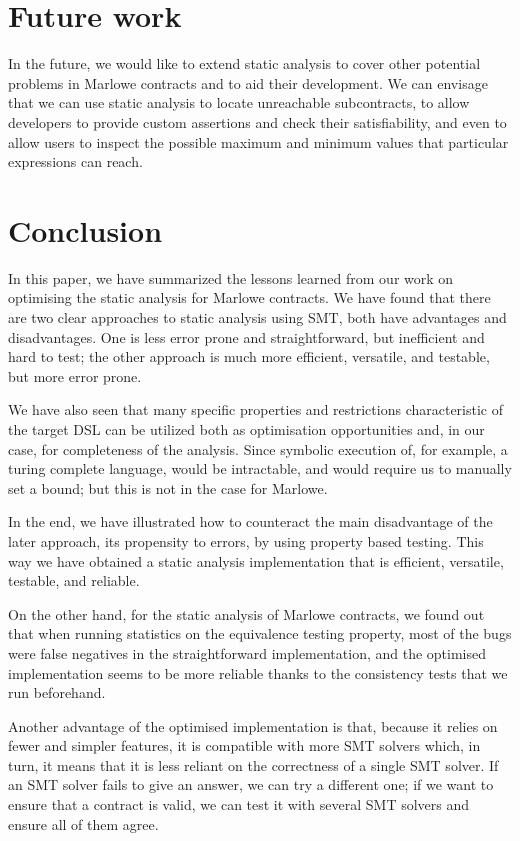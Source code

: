 \documentclass[english,runningheads]{llncs}
\begin{document}
\section{Future work }

In the future, we would like to extend static analysis to cover other
potential problems in Marlowe contracts and to aid their development.
We can envisage that we can use static analysis to locate unreachable
subcontracts, to allow developers to provide custom assertions and
check their satisfiability, and even to allow users to inspect the
possible maximum and minimum values that particular expressions can
reach. 

\section{Conclusion}

In this paper, we have summarized the lessons learned from our work
on optimising the static analysis for Marlowe contracts. We have found
that there are two clear approaches to static analysis using SMT,
both have advantages and disadvantages. One is less error prone and
straightforward, but inefficient and hard to test; the other approach
is much more efficient, versatile, and testable, but more error prone.

We have also seen that many specific properties and restrictions characteristic
of the target DSL can be utilized both as optimisation opportunities
and, in our case, for completeness of the analysis. Since symbolic
execution of, for example, a turing complete language, would be intractable,
and would require us to manually set a bound; but this is not in the
case for Marlowe.

In the end, we have illustrated how to counteract the main disadvantage
of the later approach, its propensity to errors, by using property
based testing. This way we have obtained a static analysis implementation
that is efficient, versatile, testable, and reliable.

On the other hand, for the static analysis of Marlowe contracts, we
found out that when running statistics on the equivalence testing
property, most of the bugs were false negatives in the straightforward
implementation, and the optimised implementation seems to be more
reliable thanks to the consistency tests that we run beforehand.

Another advantage of the optimised implementation is that, because
it relies on fewer and simpler features, it is compatible with more
SMT solvers which, in turn, it means that it is less reliant on the
correctness of a single SMT solver. If an SMT solver fails to give
an answer, we can try a different one; if we want to ensure that a
contract is valid, we can test it with several SMT solvers and ensure
all of them agree. 



\end{document}
